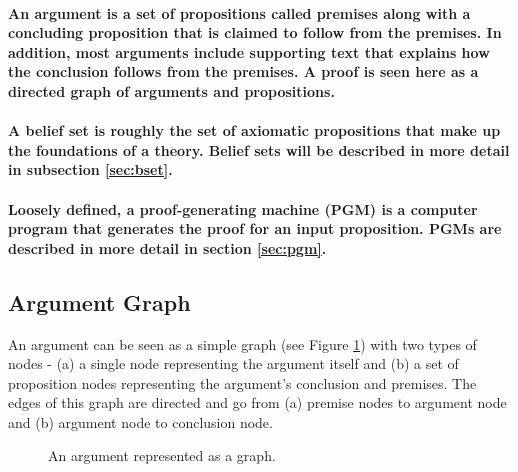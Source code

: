 \documentclass[a4paper]{article}
\begin{document}
\paragraph{An \textbf{argument} is a set of propositions called premises along with a concluding proposition that is claimed to follow from the premises. In addition, most arguments include supporting text that explains how the conclusion follows from the premises. A proof is seen here as a directed graph of arguments and propositions.}

\paragraph{A \textbf{belief set} is roughly the set of axiomatic propositions that make up the foundations of a theory. Belief sets will be described in more detail in subsection \ref{sec:bset}.}

\paragraph{Loosely defined, a \textbf{proof-generating machine} (PGM) is a computer program that generates the proof for an input proposition. PGMs are described in more detail in section \ref{sec:pgm}.}

\subsection{Argument Graph}
An argument can be seen as a simple graph (see Figure \ref{argument}) with two types of nodes - (a) a single node representing the argument itself and (b) a set of proposition nodes representing the argument's conclusion and premises. The edges of this graph are directed and go from (a) premise nodes to argument node and (b) argument node to conclusion node.

\begin{figure}[htbp]
\begin{center}
\caption{An argument represented as a graph.}
\label{argument}
\end{center}
\end{figure}
\end{document}
